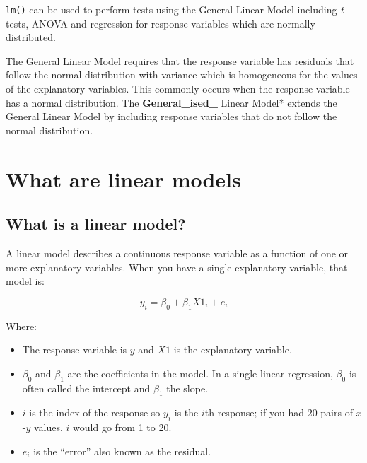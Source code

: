 \documentclass[
]{book}
\providecommand{\tightlist}{%
  \setlength{\itemsep}{0pt}\setlength{\parskip}{0pt}}
\begin{document}
\begin{key}

\texttt{lm()} can be used to perform tests using the General Linear Model including \emph{t}-tests, ANOVA and regression for response variables which are normally distributed.

\end{key}

The General Linear Model requires that the response variable has residuals that follow the normal distribution with variance which is homogeneous for the values of the explanatory variables. This commonly occurs when the response variable has a normal distribution. The \textbf{General\_ised\_} Linear Model* extends the General Linear Model by including response variables that do not follow the normal distribution.

\hypertarget{what-are-linear-models}{%
\chapter{What are linear models}\label{what-are-linear-models}}

\hypertarget{what-is-a-linear-model}{%
\section{What is a linear model?}\label{what-is-a-linear-model}}

A linear model describes a continuous response variable as a function of one or more explanatory variables. When you have a single explanatory variable, that model is:

\begin{equation}
y_{i}=\beta_{0}+\beta_{1}X1_{i}+e_{i}
\label{eq:lm1}
\end{equation}

Where:

\begin{itemize}
\tightlist
\item
  The response variable is \(y\) and \(X1\) is the explanatory variable.\\
\item
  \(\beta_{0}\) and \(\beta_{1}\) are the coefficients in the model. In a single linear regression, \(\beta_{0}\) is often called the intercept and \(\beta_{1}\) the slope.\\
\item
  \(i\) is the index of the response so \(y_{i}\) is the \(i\)th response; if you had 20 pairs of \(x\)-\(y\) values, \(i\) would go from 1 to 20.\\
\item
  \(e_{i}\) is the ``error'' also known as the residual.
\end{itemize}
\end{document}
